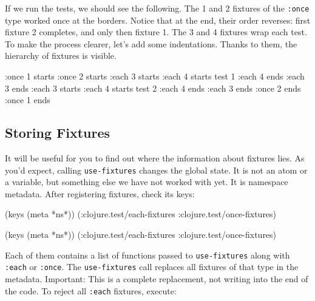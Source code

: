 If we run the tests, we should see the following. The 1 and 2 fixtures of the \verb|:once| type worked once at the borders. Notice that at the end, their order reverses: first fixture 2 completes, and only then fixture 1. The 3 and 4 fixtures wrap each test. To make the process clearer, let's add some indentations. Thanks to them, the hierarchy of fixtures is visible.


\begin{english}
  \begin{clojure}
:once 1 starts
  :once 2 starts
    :each 3 starts
      :each 4 starts
        test 1
      :each 4 ends
    :each 3 ends
    :each 3 starts
      :each 4 starts
        test 2
      :each 4 ends
    :each 3 ends
  :once 2 ends
:once 1 ends
  \end{clojure}
\end{english}

\subsection{Storing Fixtures}

It will be useful for you to find out where the information about fixtures lies. As you'd expect, calling \verb|use-fixtures| changes the global state. It is not an atom or a variable, but something else we have not worked with yet. It is namespace metadata. After registering fixtures, check its keys:


\ifx\DEVICETYPE\MOBILE

\begin{english}
  \begin{clojure}
(keys (meta *ns*))
(:clojure.test/each-fixtures
 :clojure.test/once-fixtures)
  \end{clojure}
\end{english}

\else

\begin{english}
  \begin{clojure}
(keys (meta *ns*))
(:clojure.test/each-fixtures :clojure.test/once-fixtures)
  \end{clojure}
\end{english}

\fi

Each of them contains a list of functions passed to \verb|use-fixtures| along with \verb|:each| or \verb|:once|. The \verb|use-fixtures| call replaces all fixtures of that type in the metadata. Important: This is a complete replacement, not writing into the end of the code. To reject all \verb|:each| fixtures, execute:

